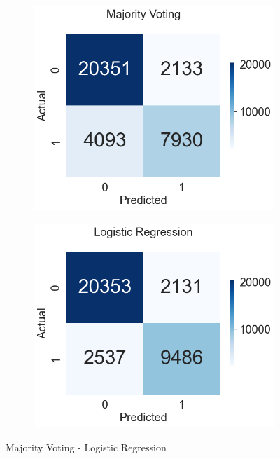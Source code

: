 \documentclass[a4paper,12pt]{report}
\theoremstyle{definitionNODot}
\begin{document}
	\begin{figure}[H]
		\centering
		\begin{subfigure}[b]{0.35\textwidth}
			\centering
			\includegraphics[width=\textwidth]{anomaly_by_voting.png}
			
			\label{fig:anomaly_by_voting}
		\end{subfigure}
		\hfil
		\begin{subfigure}[b]{0.35\textwidth}
			\centering
			\includegraphics[width=\textwidth]{anomaly_by_logistic_regression.png}
			
			\label{fig:anomaly_by_logistic_regression}
		\end{subfigure}
		\caption{Majority Voting - Logistic Regression}
		\label{fig:majoritylogistic}
	\end{figure}
	
\end{document}
